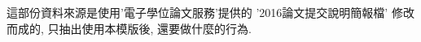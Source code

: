 
這部份資料來源是使用'電子學位論文服務'提供的 '2016論文提交說明簡報檔' 修改而成的, 只抽出使用本模版後, 還要做什麼的行為.\\

\ExampleHistoricalNotice



\EndChapter
